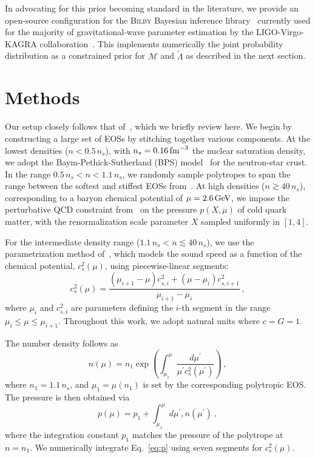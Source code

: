 \documentclass[twocolumn]{aastex631}
\begin{document}
In advocating for this prior becoming standard in the literature, we provide an open-source configuration for the \textsc{Bilby} Bayesian inference library~\citep{ashton19,romeroshaw20} currently used for the majority of gravitational-wave parameter estimation by the LIGO-Virgo-KAGRA collaboration~\citep{LIGO, Virgo, KAGRA}.
This implements numerically the joint probability distribution as a constrained prior for $\mathcal{M}$ and $\tilde{\Lambda}$ as described in the next section.
	
\section{Methods} \label{sec:Methods}
	
Our setup closely follows that of~\citet{Altiparmak:2022}, which we briefly review here. 
We begin by constructing a large set of EOSs by stitching together various components.
At the lowest densities ($n<0.5\,n_s$), with $n_s=0.16\,{\rm fm}^{-3}$ the nuclear saturation density, we adopt the Baym-Pethick-Sutherland (BPS) model~\citep{Baym71} for the neutron-star crust.
In the range $0.5\,n_s < n < 1.1\,n_s$, we randomly sample polytropes to span the range between the softest and stiffest EOSs from~\citet{Hebeler:2013nza}.
At high densities ($n \gtrsim 40\,n_s$), corresponding to a baryon chemical potential of $\mu = 2.6\,\rm GeV$, we impose the perturbative QCD constraint from~\citet{Fraga2014} on the pressure $p(X, \mu)$ of cold quark matter, with the renormalization scale parameter $X$ sampled uniformly in $[1,4]$.
	
For the intermediate density range ($1.1\,n_s < n \lesssim 40\,n_s$), we use the parametrization method of~\citet{Annala2019}, which models the sound speed as a function of the chemical potential, $c_s^2(\mu)$, using piecewise-linear segments:
\begin{equation} \label{eq:cs2}
 c_s^2(\mu) = \frac{\left(\mu_{i+1}-\mu \right) c_{s,i}^2 + \left(\mu - \mu_i \right) c_{s,i+1}^2}{\mu_{i+1}-\mu_i}\,, 
\end{equation}
where $\mu_i$ and $c_{s,i}^2$ are parameters defining the $i$-th segment in the range $\mu_i \leq \mu \leq \mu_{i+1}$.
Throughout this work, we adopt natural units where $c=G=1$.

The number density follows as 
\begin{equation} \label{eq:n}
 n(\mu) = n_1 \exp \left({\int_{\mu_1}^\mu \frac{d\mu^\prime}{\mu^\prime c_s^2(\mu^\prime)}}\right)\,, 
\end{equation} 
where $n_1 = 1.1\,n_s$, and $\mu_1 = \mu(n_1)$ is set by the corresponding polytropic EOS.
The pressure is then obtained via
\begin{equation} \label{eq:p}
 p(\mu) = p_1 + \int_{\mu_1}^\mu d\mu^\prime , n(\mu^\prime)~,
\end{equation}
where the integration constant $p_1$ matches the pressure of the polytrope at $n = n_1$.
We numerically integrate Eq.~\eqref{eq:p} using seven segments for $c_s^2(\mu)$.
\end{document}
